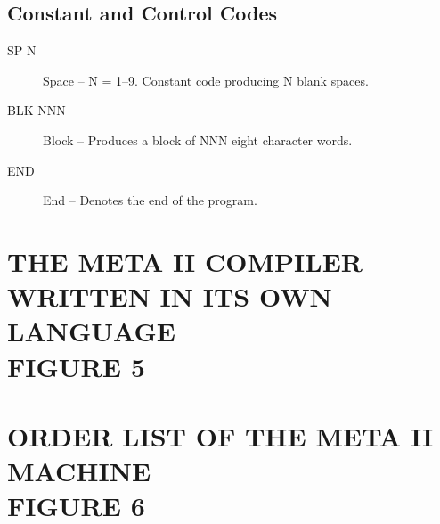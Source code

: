 \documentclass[twocolumn]{article}
\begin{document}
\subsection{Constant and Control Codes}
\begin{description}
\item[SP  N]      Space -- N = 1--9. Constant code producing N blank spaces.

\item[BLK NNN]    Block -- Produces a block of NNN eight character words.

\item[END]        End -- Denotes the end of the program.
\end{description}

\pagebreak

\section{THE META II COMPILER WRITTEN IN ITS OWN LANGUAGE\\FIGURE 5}


\section{ORDER LIST OF THE META II MACHINE\\FIGURE 6}
\end{document}
